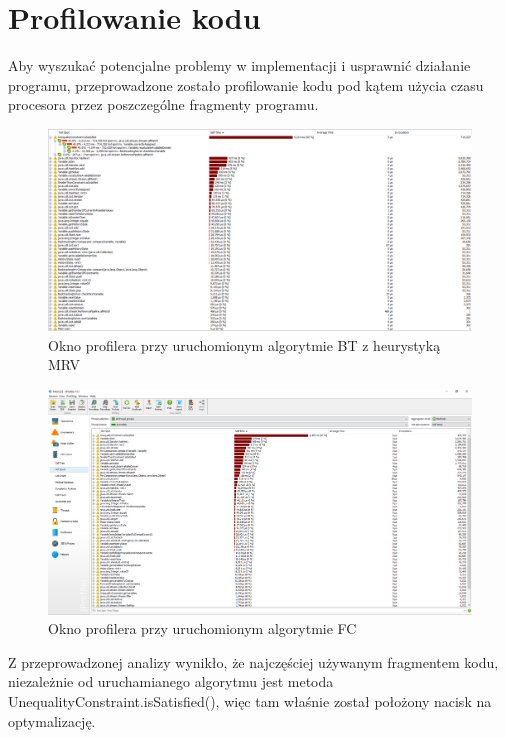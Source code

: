 \documentclass{article}
\begin{document}
\section{Profilowanie kodu}
Aby wyszukać potencjalne problemy w implementacji i usprawnić działanie programu, przeprowadzone zostało profilowanie kodu pod kątem użycia czasu procesora przez poszczególne fragmenty programu.
\begin{figure}[H]
	\centering
	\includegraphics[width=1\linewidth]{bt_futo_mrv.png}
	\caption{Okno profilera przy uruchomionym algorytmie BT z heurystyką MRV}
	\label{fig:bt_mrv_profiling}
\end{figure}

\begin{figure}[H]
	\centering
	\includegraphics[width=1\linewidth]{fc_futo.png}
	\caption{Okno profilera przy uruchomionym algorytmie FC}
	\label{fig:fc_futo_profiling}
\end{figure}

Z przeprowadzonej analizy wynikło, że najczęściej używanym fragmentem kodu, niezależnie od uruchamianego algorytmu jest metoda UnequalityConstraint.isSatisfied(), więc tam właśnie został położony nacisk na optymalizację.
\end{document}
